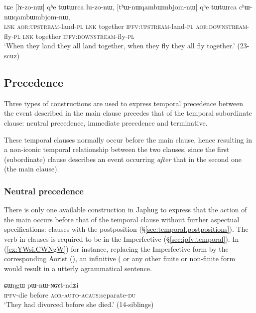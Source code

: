 \begin{exe}
\ex \label{ex:tWtWrca.luzonW2}
\gll tɕe [lɤ-zo-nɯ] qʰe tɯtɯrca lu-zo-nɯ, [tʰɯ-nɯqambɯmbjom-nɯ] qʰe tɯtɯrca cʰɯ-nɯqambɯmbjom-nɯ, \\
\textsc{lnk} \textsc{aor}:\textsc{upstream}-land-\textsc{pl}  \textsc{lnk} together  \textsc{ipfv}:\textsc{upstream}-land-\textsc{pl} \textsc{aor}:\textsc{downstream}-fly-\textsc{pl}  \textsc{lnk} together  \textsc{ipfv}:\textsc{downstream}-fly-\textsc{pl} \\
\glt `When they land they all land together, when they fly they all fly together.' (23-scuz)
\end{exe}
 
 
\subsection{Precedence}
Three types of constructions are used to express temporal precedence between the event described in the main clause precedes that of the temporal subordinate clause: neutral precedence, immediate precedence and terminative. 

These temporal clauses normally occur before the main clause, hence resulting in a non-iconic temporal relationship between the two clauses, since the first (subordinate) clause describes an event occurring \textit{after} that in the second one (the main clause).

 \subsubsection{Neutral precedence} \label{sec:precedence.CWNgW}
There is only one available construction in Japhug to express that the action of the main occurs before that of the temporal clause without further aspectual specifications: clauses with the postposition  (§\ref{sec:temporal.postpositions}). The verb in  clauses is required to be in the Imperfective (§\ref{sec:ipfv.temporal}). In (\ref{ex:YWsi.CWNgW}) for instance, replacing the Imperfective form  by the corresponding Aorist (), an infinitive ( or any other finite or non-finite form would result in a utterly agrammatical sentence.

\begin{exe}
\ex \label{ex:YWsi.CWNgW}
\gll [ɲɯ-si] ɕɯŋgɯ pɯ-nɯ-ɴɢɤt-ndʑi  \\
\textsc{ipfv}-die before \textsc{aor}-\textsc{auto}-\textsc{acaus}:separate-\textsc{du} \\
\glt `They had divorced before she died.' (14-siblings)
\end{exe}

